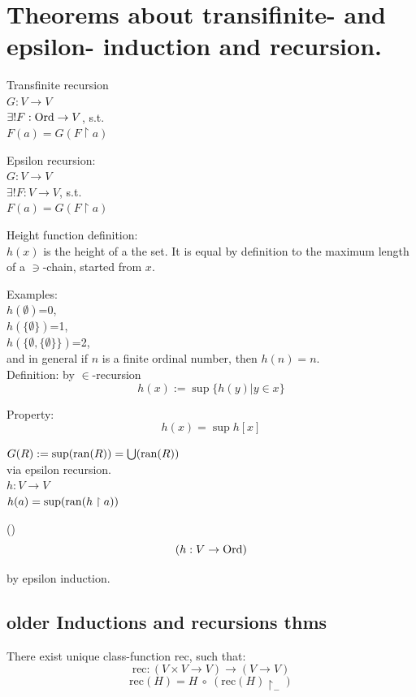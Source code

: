 \def\topic{Induction \& Recursion}

\section{Theorems about transifinite- and epsilon- induction and recursion.}

\begin{recall}
Transfinite recursion\\
$G:V\to V$\\
$\exists! F:\mathrm{Ord}\to V$, s.t.\\
$F(a) = G(F\restriction a)$\\
\end{recall}
\begin{recall}
Epsilon recursion:\\
$G:V\to V$\\
$\exists! F:V\to V$, s.t.\\
$F(a) = G(F\restriction a)$\\
\end{recall}

\begin{definition}
Height function definition:\\
$h(x)$ is the height of a the set. It is equal by definition to the maximum length of a $\ni$-chain, started from $x$.\\
\end{definition}

Examples:\\
$h(\emptyset)$=0,\\
$h(\{\emptyset\})$=1,\\
$h(\{\emptyset,\{\emptyset\}\})$=2,\\
and in general if $n$ is a finite ordinal number, then $h(n)=n$.\\
Definition: by $\in$-recursion
\[
h(x) := \sup \{ h(y) | y \in x\}
\]

Property:
\[
h(x) = \sup h[x]
\]

$G(R) := \sup(\mathrm{ran}(R)) = \bigcup(\mathrm{ran}(R))$\\
via epsilon recursion.\\
$h : V\to V$\\
$h(a) = \sup(\mathrm{ran}(h\restriction a) )$\\



\begin{lemma}()
\[
(h:V\to\mathrm{Ord})
\]
\end{lemma}
\Proof
by epsilon induction.\\
\Done

\subsection{older Inductions and recursions thms}%
There exist unique class-function rec, such that:
\[
\mbox{rec}:(V\times V\to V)\to(V\to V)
\]
\[
\mbox{rec}(H) = H\ \circ\ (\mbox{rec}(H)\restriction_-)
\]

